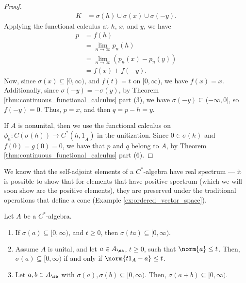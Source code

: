 \begin{proof}
  \begin{align*}
    K &= \sigma\left( h \right)\cup \sigma\left( x \right)\cup \sigma\left( -y \right).
  \end{align*}
  Applying the functional calculus at $h$, $x$, and $y$, we have
  \begin{align*}
    p &= f(h)\\
      &= \lim_{n\rightarrow\infty}p_n(h)\\
      &= \lim_{n\rightarrow\infty} \left( p_n\left( x \right)-p_n\left( y \right) \right)\\
      &= f(x) + f(-y).
  \end{align*}
  Now, since $\sigma\left( x \right)\subseteq [0,\infty)$, and $f(t) = t$ on $[0,\infty)$, we have $f(x) = x$. Additionally, since $\sigma\left( -y \right) = -\sigma\left( y \right)$, by Theorem \ref{thm:continuous_functional_calculus} part (3), we have $\sigma\left( -y \right)\subseteq (-\infty,0]$, so $f\left( -y \right) = 0$. Thus, $p = x$, and then $q = p-h = y$.\newline

  If $A$ is nonunital, then we use the functional calculus on $\phi_h\colon C\left( \sigma\left( h \right) \right)\rightarrow C^{\ast}\left( h,1_{\widetilde{A}} \right)$ in the unitization. Since $0\in \sigma\left( h \right)$ and $f(0) = g(0) = 0$, we have that $p$ and $q$ belong to $A$, by Theorem \ref{thm:continuous_functional_calculus} part (6).
\end{proof}
We know that the self-adjoint elements of a $C^{\ast}$-algebra have real spectrum --- it is possible to show that for elements that have positive spectrum (which we will soon show are the positive elements), they are preserved under the traditional operations that define a cone (Example \ref{ex:ordered_vector_space}).
\begin{lemma}\label{lemma:spectrum_conic_operations}
  Let $A$ be a $C^{\ast}$-algebra.
  \begin{enumerate}[(1)]
    \item If $\sigma\left( a \right)\subseteq [0,\infty)$, and $t\geq 0$, then $\sigma\left( ta \right)\subseteq [0,\infty)$.
    \item Assume $A$ is unital, and let $a\in A_{\sa}$, $t \geq 0$, such that $\norm{a}\leq t$. Then, $\sigma\left( a \right)\subseteq [0,\infty)$ if and only if $\norm{t1_A - a} \leq t$.
    \item Let $a,b\in A_{\sa}$ with $\sigma\left( a \right),\sigma\left( b \right)\subseteq [0,\infty)$. Then, $\sigma\left( a+b \right)\subseteq [0,\infty)$.
  \end{enumerate}
\end{lemma}
